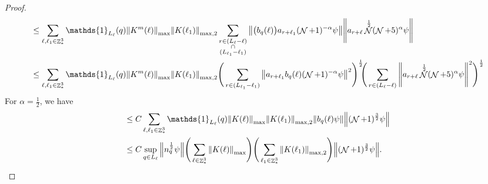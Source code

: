 \documentclass[sn-mathphys, Numbered ,a4paper]{sn-jnl}%
\DeclareMathOperator{\Z}{\mathbb{Z}}
\DeclareMathOperator{\NN}{\mathcal{N}}
\newcommand{\half}{\frac{1}{2}}
\theoremstyle{plain}
\theoremstyle{definition}
\theoremstyle{remark}
\theoremstyle{plain}
\theoremstyle{definition}
\theoremstyle{remark}
\begin{document}
\begin{proof}
\begin{align}
		&\leq \sum\limits_{\ell,\ell_1 \in \Z^3_*} \mathds{1}_{L_\ell}(q) \norm{K^{m}(\ell)}_{\mathrm{max}}\norm{K(\ell_1)}_{\mathrm{max},2} \sum\limits_{\substack{r \in (L_\ell-\ell) \\ \cap \\ (L_{\ell_1}-\ell_1)}} \norm{\big(b_{q}(\ell)\big) a_{r+\ell_1} (\NN+1)^{-\alpha} \psi} \norm { a_{r+\ell}\NN^\half (\NN+5)^{\alpha} \psi }\nonumber\\
		&\leq \sum\limits_{\ell,\ell_1 \in \Z^3_*} \mathds{1}_{L_\ell}(q) \norm{K^{m}(\ell)}_{\mathrm{max}}\norm{K(\ell_1)}_{\mathrm{max},2} \Bigg(\sum\limits_{r \in (L_{\ell_1}-\ell_1)} \norm{ a_{r+\ell_1}b_{q}(\ell) (\NN+1)^{-\alpha} \psi}^2\Bigg)^\half\!\!\Bigg( \sum\limits_{r \in (L_\ell-\ell)} \norm { a_{r+\ell}\NN^\half (\NN+5)^{\alpha} \psi }^2\Bigg)^\half\nonumber\\
	\end{align}
	For $\alpha = \half$, we have
	\begin{align}
		&\leq C\sum\limits_{\ell,\ell_1 \in \Z^3_*} \mathds{1}_{L_\ell}(q) \norm{K(\ell)}_{\mathrm{max}}\norm{K(\ell_1)}_{\mathrm{max},2}  \norm{b_{q}(\ell) \psi} \norm { (\NN+1)^{\frac{3}{2}} \psi }\nonumber\\
		&\leq C \sup\limits_{q \in L_\ell} \norm{n_{q}^{\half} \psi} \Bigg(\sum\limits_{\ell \in \Z^3_*} \norm{K(\ell)}_{\mathrm{max}}\Bigg)\Bigg( \sum\limits_{\ell_1 \in \Z^3_*}\norm{K(\ell_1)}_{\mathrm{max},2} \Bigg)  \norm { (\NN+1)^{\frac{3}{2}} \psi }. \label{eq:preleadbosest}
	\end{align}
\end{proof}
\end{document}
